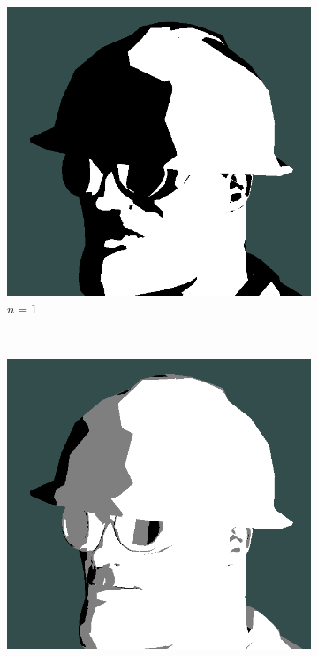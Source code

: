 \begin{figure}[h]
    \centering
    \begin{subfigure}[b]{0.15\textwidth}
        \includegraphics[width=\textwidth]{img/cel-shading-n1.png}
        \caption{$n = 1$}
        \label{fig:cel-shading-n1}
    \end{subfigure}
    ~
    \begin{subfigure}[b]{0.15\textwidth}
        \includegraphics[width=\textwidth]{img/cel-shading-n2.png}

\end{subfigure}
\end{figure}
